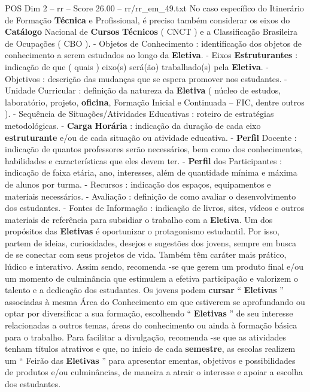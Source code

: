 \begin{textsample}{POS Dim 2 – rr – Score 26.00 – rr/rr\_em\_49.txt}
No caso específico do Itinerário de Formação \textbf{Técnica} e Profissional, é preciso também considerar os eixos do \textbf{Catálogo} Nacional de \textbf{Cursos} \textbf{Técnicos} ( CNCT ) e a Classificação Brasileira de Ocupações ( CBO ). - Objetos de Conhecimento : identificação dos objetos de conhecimento a serem estudados ao longo da \textbf{Eletiva}. - Eixos \textbf{Estruturantes} : indicação de que ( quais ) eixo(s) será(ão) trabalhado(s) pela \textbf{Eletiva}. - Objetivos : descrição das mudanças que se espera promover nos estudantes. - Unidade Curricular : definição da natureza da \textbf{Eletiva} ( núcleo de estudos, laboratório, projeto, \textbf{oficina}, Formação Inicial e Continuada – FIC, dentre outros ). - Sequência de Situações/Atividades Educativas : roteiro de estratégias metodológicas. - \textbf{Carga} \textbf{Horária} : indicação da duração de cada eixo \textbf{estruturante} e/ou de cada situação ou atividade educativa. - \textbf{Perfil} Docente : indicação de quantos professores serão necessários, bem como dos conhecimentos, habilidades e características que eles devem ter. - \textbf{Perfil} dos Participantes : indicação de faixa etária, ano, interesses, além de quantidade mínima e máxima de alunos por turma. - Recursos : indicação dos espaços, equipamentos e materiais necessários. - Avaliação : definição de como avaliar o desenvolvimento dos estudantes. - Fontes de Informação : indicação de livros, sites, vídeos e outros materiais de referência para subsidiar o trabalho com a \textbf{Eletiva}.
Um dos propósitos das \textbf{Eletivas} é oportunizar o protagonismo estudantil.
Por isso, partem de ideias, curiosidades, desejos e sugestões dos jovens, sempre em busca de se conectar com seus projetos de vida.
Também têm caráter mais prático, lúdico e interativo.
Assim sendo, recomenda -se que gerem um produto final e/ou um momento de culminância que estimulem a efetiva participação e valorizem o talento e a dedicação dos estudantes.
Os jovens podem \textbf{cursar} “ \textbf{Eletivas} ” associadas à mesma Área do Conhecimento em que estiverem se aprofundando ou optar por diversificar a sua formação, escolhendo “ \textbf{Eletivas} ” de seu interesse relacionadas a outros temas, áreas do conhecimento ou ainda à formação básica para o trabalho.
Para facilitar a divulgação, recomenda -se que as atividades tenham títulos atrativos e que, no início de cada \textbf{semestre}, as escolas realizem um “ Feirão das \textbf{Eletivas} ” para apresentar ementas, objetivos e possibilidades de produtos e/ou culminâncias, de maneira a atrair o interesse e apoiar a escolha dos estudantes.

\end{textsample}
